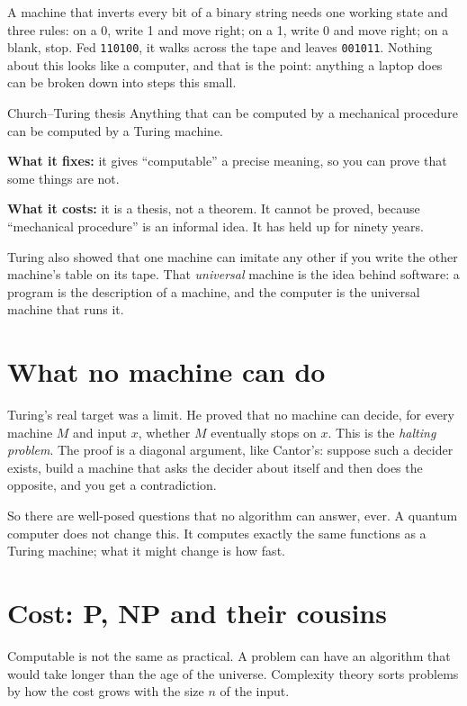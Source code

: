 A machine that inverts every bit of a binary string needs one working state and
three rules: on a 0, write 1 and move right; on a 1, write 0 and move right; on a
blank, stop. Fed \texttt{110100}, it walks across the tape and leaves
\texttt{001011}. Nothing about this looks like a computer, and that is the point:
anything a laptop does can be broken down into steps this small.

\begin{concept}{Church--Turing thesis}
Anything that can be computed by a mechanical procedure can be computed by a
Turing machine.

\textbf{What it fixes:} it gives ``computable'' a precise meaning, so you can
prove that some things are not.

\textbf{What it costs:} it is a thesis, not a theorem. It cannot be proved,
because ``mechanical procedure'' is an informal idea. It has held up for ninety
years.
\end{concept}

Turing also showed that one machine can imitate any other if you write the other
machine's table on its tape. That \emph{universal} machine is the idea behind
software: a program is the description of a machine, and the computer is the
universal machine that runs it.

\section{What no machine can do}

Turing's real target was a limit. He proved that no machine can decide, for every
machine $M$ and input $x$, whether $M$ eventually stops on $x$. This is the
\emph{halting problem}. The proof is a diagonal argument, like Cantor's: suppose
such a decider exists, build a machine that asks the decider about itself and
then does the opposite, and you get a contradiction.

So there are well-posed questions that no algorithm can answer, ever. A quantum
computer does not change this. It computes exactly the same functions as a Turing
machine; what it might change is how fast.

\section{Cost: P, NP and their cousins}

Computable is not the same as practical. A problem can have an algorithm that
would take longer than the age of the universe. Complexity theory sorts problems
by how the cost grows with the size $n$ of the input.


